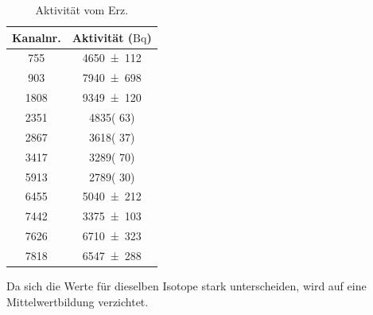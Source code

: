 \begin{table}[H]
    \centering
    \caption{Aktivität vom Erz.}
    \label{tab:erz_aktivität}
    \begin{tabular}{c c}
        \toprule
        {Kanalnr.} & {Aktivität ($\si{\becquerel}$)} \\
        \midrule 
        755 & \num{4650(112)} \\
        903 & \num{7940(698)} \\
        1808 & \num{9349(120)} \\
        2351 & \num{4835( 63)} \\
        2867 & \num{3618( 37)} \\
        3417 & \num{3289( 70)} \\
        5913 & \num{2789( 30)} \\
        6455 & \num{5040(212)} \\
        7442 & \num{3375(103)} \\
        7626 & \num{6710(323)} \\
        7818 & \num{6547(288)} \\
        \bottomrule
    \end{tabular}
\end{table}

Da sich die Werte für dieselben Isotope stark unterscheiden, wird auf eine Mittelwertbildung verzichtet.